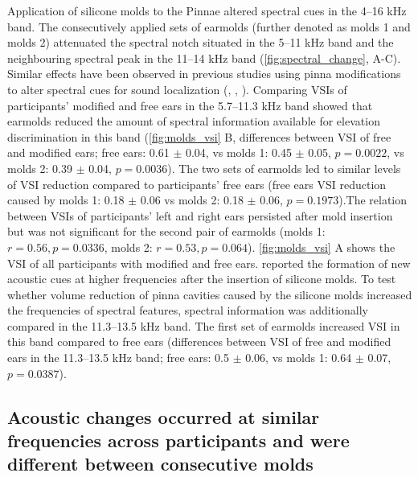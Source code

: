 Application of silicone molds to the Pinnae altered spectral cues in the 4–16 kHz band. The consecutively applied sets of earmolds (further denoted as molds 1 and molds 2) attenuated the spectral notch situated in the 5–11 kHz band and the neighbouring spectral peak in the 11–14 kHz band (\cref{fig:spectral_change}, A-C). Similar effects have been observed in previous studies using pinna modifications to alter spectral cues for sound localization (\citet{trapeau_fast_2016}, \citet{wanrooij_relearning_2005}, \citet{hofman_relearning_1998}). Comparing VSIs of participants' modified and free ears in the 5.7–11.3 kHz band showed that earmolds reduced the amount of spectral information available for elevation discrimination in this band (\cref{fig:molds_vsi} B, differences between VSI of free and modified ears; free ears: 0.61 $\pm$ 0.04, vs molds 1: 0.45 $\pm$ 0.05, $p = 0.0022$, vs molds 2: 0.39 $\pm$ 0.04, $p = 0.0036$). The two sets of earmolds led to similar levels of VSI reduction compared to participants' free ears (free ears VSI reduction caused by molds 1: 0.18 $\pm$ 0.06 vs molds 2: 0.18 $\pm$ 0.06, $p = 0.1973$).The relation between VSIs of participants' left and right ears persisted after mold insertion but was not significant for the second pair of earmolds (molds 1: $r = 0.56, p = 0.0336$, molds 2: $r = 0.53, p = 0.064$). \cref{fig:molds_vsi} A shows the VSI of all participants with modified and free ears. \citet{wanrooij_relearning_2005} reported the formation of new acoustic cues at higher frequencies after the insertion of silicone molds. To test whether volume reduction of pinna cavities caused by the silicone molds increased the frequencies of spectral features, spectral information was additionally compared in the 11.3–13.5 kHz band. The first set of earmolds increased VSI in this band compared to free ears (differences between VSI of free and modified ears in the 11.3–13.5 kHz band; free ears: 0.5 $\pm$ 0.06, vs molds 1: 0.64 $\pm$ 0.07, $p = 0.0387$).


\subsection{Acoustic changes occurred at similar frequencies across participants and were different between consecutive molds}

 
